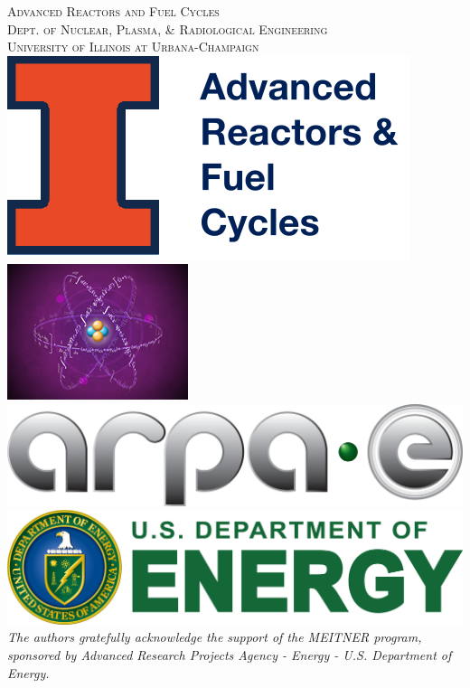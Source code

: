 \documentclass[12pt]{article} %
\begin{document}
\begin{titlepage}
    \textsc{\LARGE Advanced Reactors and Fuel Cycles}\\[0.25cm] %
    
    \textsc{\large Dept. of Nuclear, Plasma, \& Radiological Engineering}\\%
    
    \textsc{\large University of Illinois at Urbana-Champaign}\\ %
    \vspace{0.5cm}
    \includegraphics[scale=0.2]{arfc-smol}
    \includegraphics[scale=0.18]{meitner.png}
    \includegraphics[scale=0.25]{arpa-e.png}
    \includegraphics[scale=0.17]{doe-logo.png}\\[1cm] %
    \textit{The authors gratefully acknowledge the support of the MEITNER program, sponsored by Advanced Research Projects Agency - Energy - U.S. Department of Energy.}  

\end{titlepage}
\end{document}
